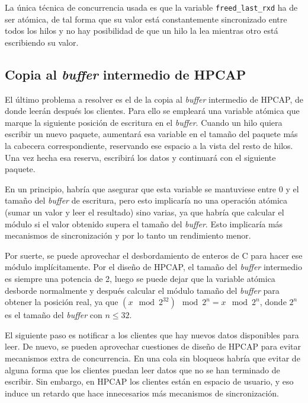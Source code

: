 \documentclass[oneside, draft]{epstfg}
\begin{document}
La única técnica de concurrencia usada es que la variable \texttt{freed\_last\_rxd} ha de ser atómica, de tal forma que su valor está constantemente sincronizado entre todos los hilos y no hay posibilidad de que un hilo la lea mientras otro está escribiendo su valor.

\subsection{Copia al \textit{buffer} intermedio de HPCAP}

El último problema a resolver es el de la copia al \textit{buffer} intermedio de HPCAP, de donde leerán después los clientes. Para ello se empleará una variable atómica que marque la siguiente posición de escritura en el \textit{buffer}. Cuando un hilo quiera escribir un nuevo paquete, aumentará esa variable en el tamaño del paquete más la cabecera correspondiente, reservando ese espacio a la vista del resto de hilos. Una vez hecha esa reserva, escribirá los datos y continuará con el siguiente paquete.

En un principio, habría que asegurar que esta variable se mantuviese entre 0 y el tamaño del \textit{buffer} de escritura, pero esto implicaría no una operación atómica (sumar un valor y leer el resultado) sino varias, ya que habría que calcular el módulo si el valor obtenido supera el tamaño del \textit{buffer}. Esto implicaría más mecanismos de sincronización y por lo tanto un rendimiento menor.

Por suerte, se puede aprovechar el desbordamiento de enteros de C para hacer ese módulo implícitamente. Por el diseño de HPCAP, el tamaño del \textit{buffer} intermedio es siempre una potencia de 2, luego se puede dejar que la variable atómica desborde normalmente y después calcular el módulo tamaño del \textit{buffer} para obtener la posición real, ya que $(x \mod 2^{32}) \mod 2^n = x \mod 2^n$, donde $2^n$ es el tamaño del \textit{buffer} con $n ≤ 32$.

El siguiente paso es notificar a los clientes que hay nuevos datos disponibles para leer. De nuevo, se pueden aprovechar cuestiones de diseño de HPCAP para evitar mecanismos extra de concurrencia. En una cola sin bloqueos habría que evitar de alguna forma que los clientes puedan leer datos que no se han terminado de escribir. Sin embargo, en HPCAP los clientes están en espacio de usuario, y eso induce un retardo que hace innecesarios más mecanismos de sincronización.
\end{document}
